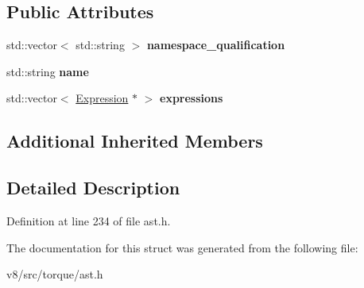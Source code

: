 \subsection*{Public Attributes}
\begin{DoxyCompactItemize}
\item 
\mbox{\label{structv8_1_1internal_1_1torque_1_1StructExpression_a4ba5c900e4136be84271a87cb4a4c8d3}} 
std\+::vector$<$ std\+::string $>$ {\bfseries namespace\+\_\+qualification}
\item 
\mbox{\label{structv8_1_1internal_1_1torque_1_1StructExpression_a31bbb243012de20db80bc50ef86c1a64}} 
std\+::string {\bfseries name}
\item 
\mbox{\label{structv8_1_1internal_1_1torque_1_1StructExpression_ac8b067d3405131240407dd02753b2537}} 
std\+::vector$<$ \mbox{\hyperlink{structv8_1_1internal_1_1torque_1_1Expression}{Expression}} $\ast$ $>$ {\bfseries expressions}
\end{DoxyCompactItemize}
\subsection*{Additional Inherited Members}


\subsection{Detailed Description}


Definition at line 234 of file ast.\+h.



The documentation for this struct was generated from the following file\+:\begin{DoxyCompactItemize}
\item 
v8/src/torque/ast.\+h\end{DoxyCompactItemize}
